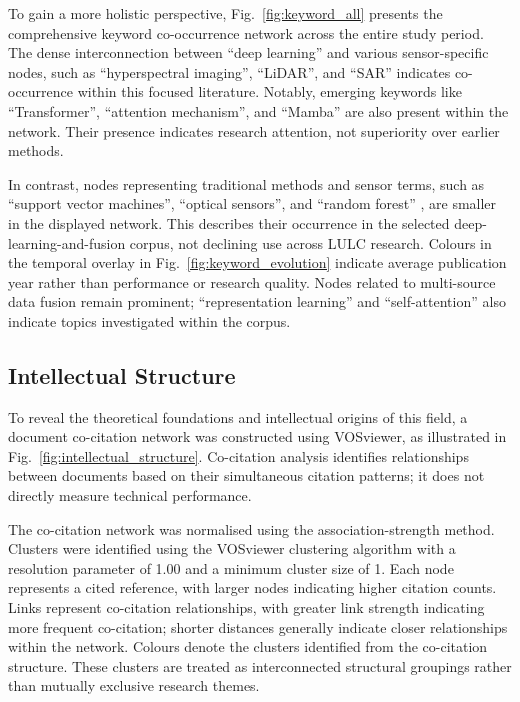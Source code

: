 \documentclass[]{interact}
\theoremstyle{plain}%
\theoremstyle{definition}
\theoremstyle{remark}
\begin{document}
To gain a more holistic perspective, Fig.~\ref{fig:keyword_all} presents the comprehensive keyword co-occurrence network across the entire study period. The dense interconnection between ``deep learning'' and various sensor-specific nodes, such as ``hyperspectral imaging'', ``LiDAR'', and ``SAR'' indicates co-occurrence within this focused literature. Notably, emerging keywords like ``Transformer'', ``attention mechanism'', and ``Mamba'' are also present within the network. Their presence indicates research attention, not superiority over earlier methods.

In contrast, nodes representing traditional methods and sensor terms, such as ``support vector machines'', ``optical sensors'', and ``random forest'' \citep{belgiu2016random}, are smaller in the displayed network. This describes their occurrence in the selected deep-learning-and-fusion corpus, not declining use across LULC research. Colours in the temporal overlay in Fig.~\ref{fig:keyword_evolution} indicate average publication year rather than performance or research quality. Nodes related to multi-source data fusion remain prominent; ``representation learning'' and ``self-attention'' also indicate topics investigated within the corpus.

\FloatBarrier
\subsection{Intellectual Structure}
To reveal the theoretical foundations and intellectual origins of this field, a document co-citation network was constructed using VOSviewer, as illustrated in Fig.~\ref{fig:intellectual_structure}. Co-citation analysis identifies relationships between documents based on their simultaneous citation patterns; it does not directly measure technical performance.

The co-citation network was normalised using the association-strength method. Clusters were identified using the VOSviewer clustering algorithm with a resolution parameter of 1.00 and a minimum cluster size of 1. Each node represents a cited reference, with larger nodes indicating higher citation counts. Links represent co-citation relationships, with greater link strength indicating more frequent co-citation; shorter distances generally indicate closer relationships within the network. Colours denote the clusters identified from the co-citation structure. These clusters are treated as interconnected structural groupings rather than mutually exclusive research themes.
\end{document}
